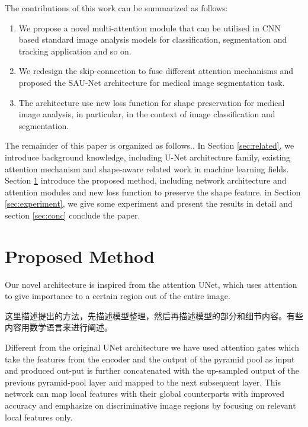\documentclass{ieeeaccess}
\begin{document}
The contributions of this work can be summarized as follows:
\begin{enumerate}
  \item We propose a novel multi-attention module that can be utilised in CNN based standard image analysis models for classification, segmentation and tracking application and so on.
  \item We redesign the skip-connection to fuse different attention mechanisms and proposed the SAU-Net architecture for medical image segmentation task. 
  \item The architecture use new loss function for shape preservation for medical image analysis, in particular, in the context of image classification and segmentation.
\end{enumerate}
  
The remainder of this paper is organized as follows.. In Section \ref{sec:related}, we introduce background knowledge, including U-Net architecture family, existing attention mechanism and shape-aware related work in machine learning fields. Section \ref{sec:method} introduce the proposed method, including network architecture and attention modules and new loss function to preserve the shape feature. in Section \ref{sec:experiment}, we give some experiment and present the results in detail and section \ref{sec:conc} conclude the paper.
  
\section{Proposed Method}\label{sec:method}
Our novel architecture is inspired from the attention UNet, which uses attention to give importance to a certain region out
of the entire image.

这里描述提出的方法，先描述模型整理，然后再描述模型的部分和细节内容。有些内容用数学语言来进行阐述。

Different from the original UNet architecture we have used attention gates which take the features from the encoder and the output of the pyramid pool as input and produced out-put is further concatenated with the up-sampled output of the previous pyramid-pool layer and mapped to the next subsequent layer. This network can map local features with their global counterparts with improved accuracy and emphasize on discriminative image regions by focusing on relevant local features only.
\end{document}

